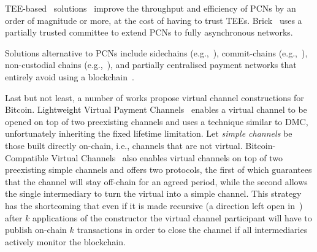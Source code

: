   TEE-based~\cite{zhao2019sok}
solutions~\cite{teechan,10.1145/3341301.3359627,DBLP:conf/asiaccs/LiaoZSS22,lee2020routee}
  improve the throughput and efficiency of PCNs by an order of magnitude or
  more, at the cost of having to trust TEEs. Brick~\cite{avarikioti2020brick}
  uses a partially trusted committee to extend PCNs to fully asynchronous
  networks.

  Solutions alternative to PCNs include side\-chains
  (e.g.,~\cite{BCDF+14,sidechains,KiaZin18}), commit-chains
  (e.g.,~\cite{plasma}), non-custo\-dial chains
  (e.g.,~\cite{plasma,konstantopoulos2019plasma,plasma-lower-bounds}),
  and partially centralised payment networks that entirely avoid using a
  blockchain~\cite{DBLP:conf/trust/ArmknechtKMYZ15,stellar,silentwhispers,DBLP:conf/ndss/RoosMKG18}.

  Last but not least, a number of works propose virtual channel constructions
  for Bitcoin. Lightweight Virtual Payment
  Channels~\cite{10.1007/978-3-030-65411-5_18} enables a virtual channel to be
  opened on top of two preexisting channels and uses a technique similar to DMC,
  unfortunately inheriting the fixed lifetime limitation.
  Let \emph{simple channels} be those built directly on-chain, i.e., channels that are not
  virtual.
  Bitcoin-Compatible Virtual Channels~\cite{9519487} also enables
  virtual channels on top of two preexisting simple channels
  and offers two protocols, the first of which guarantees that the channel will
  stay off-chain for an agreed period, while the second allows the single intermediary
  to turn the virtual into a simple channel.
  This strategy has the shortcoming that even if it is made
  recursive (a direction left open in~\cite{9519487}) after $k$
  applications of the constructor the virtual channel participant will have to
  publish on-chain $k$ transactions in order to close the channel if all
  intermediaries actively monitor the blockchain.

